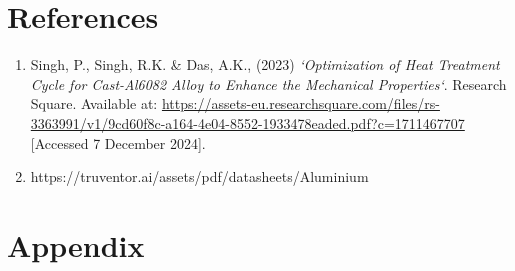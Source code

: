 \documentclass{article}
\begin{document}
    \newpage\vspace*{-5pt}
    \section{References}
    \begin{enumerate}
        \item Singh, P., Singh, R.K. \& Das, A.K., (2023) \textit{‘Optimization of Heat Treatment Cycle for Cast-Al6082 Alloy to Enhance the Mechanical Properties‘}. Research Square. Available at: 	\url{https://assets-eu.researchsquare.com/files/rs-3363991/v1/9cd60f8c-a164-4e04-8552-1933478eaded.pdf?c=1711467707} [Accessed 7 December 2024]. 
        
        \item https://truventor.ai/assets/pdf/datasheets/Aluminium%
        
    \end{enumerate}
    
    
    

    \newpage\vspace*{-5pt}
    
   
    
\section{Appendix}
\normalsize
\renewcommand{\thesubsection}{\Alph{subsection}}
\end{document}

